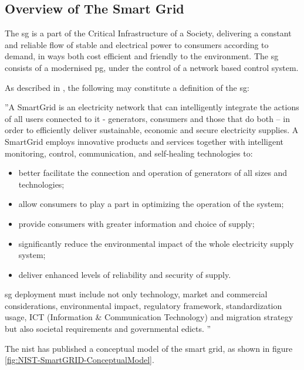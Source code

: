 \subsection{Overview of The Smart Grid}
The \acrshort{sg} is a part of the Critical Infrastructure of a Society, delivering a constant and reliable flow of stable and electrical power to consumers according to demand, in ways both cost efficient and friendly to the environment. The \acrshort{sg} consists of a modernised \acrshort{pg}, under the control of a network based control system. 


As described in \cite{smartgrids2012smartgrids}, the following may constitute a definition of the \acrlong{sg}:

\begin{displayquote}
''A SmartGrid is an electricity network that can intelligently integrate the actions of all
users connected to it - generators, consumers and those that do both – in order to
efficiently deliver sustainable, economic and secure electricity supplies.
A SmartGrid employs innovative products and services together with intelligent monitoring,
control, communication, and self-healing technologies to:
\begin{itemize}
\item better facilitate the connection and operation of generators of all sizes and technologies;
\item allow consumers to play a part in optimizing the operation of the system;
\item provide consumers with greater information and choice of supply;
\item significantly reduce the environmental impact of the whole electricity supply system;
\item deliver enhanced levels of reliability and security of supply.
\end{itemize}
\acrshort{sg} deployment must include not only technology, market and commercial
considerations, environmental impact, regulatory framework, standardization usage, ICT
(Information \& Communication Technology) and migration strategy but also societal
requirements and governmental edicts. 
'' 
\end{displayquote}

The \acrfull{nist} has published a conceptual model of the smart grid, as shown in 
figure \ref{fig:NIST-SmartGRID-ConceptualModel}.



